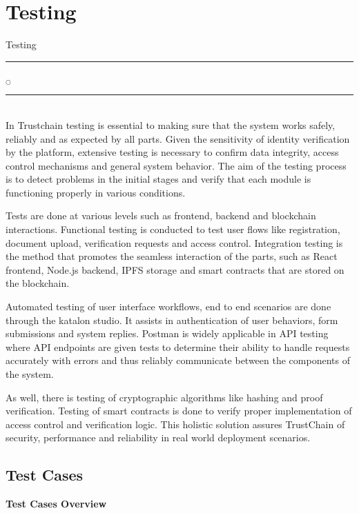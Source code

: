 
\chapter[Testing]{Testing}{Testing}\label{Test}
\noindent
\rule{0.49\textwidth}{0.75pt} $_{\bigcirc}$ \rule{0.49\textwidth}{0.75pt}\\
In Trustchain testing is essential to making sure that the system works safely, reliably and as expected by all parts. Given the sensitivity of identity verification by the platform, extensive testing is necessary to confirm data integrity, access control mechanisms and general system behavior. The aim of the testing process is to detect problems in the initial stages and verify that each module is functioning properly in various conditions.

Tests are done at various levels such as frontend, backend and blockchain interactions. Functional testing is conducted to test user flows like registration, document upload, verification requests and access control. Integration testing is the method that promotes the seamless interaction of the parts, such as React frontend, Node.js backend, IPFS storage and smart contracts that are stored on the blockchain.

Automated testing of user interface workflows, end to end scenarios are done through the katalon studio. It assists in authentication of user behaviors, form submissions and system replies. Postman is widely applicable in API testing where API endpoints are given tests to determine their ability to handle requests accurately with errors and thus reliably communicate between the components of the system.

As well, there is testing of cryptographic algorithms like hashing and proof verification. Testing of smart contracts is done to verify proper implementation of access control and verification logic. This holistic solution assures TrustChain of security, performance and reliability in real world deployment scenarios.
\\
\noindent

\section{Test Cases}



\renewcommand{\arraystretch}{1.1}
\begin{center}
\textbf{Test Cases Overview}
\end{center}

